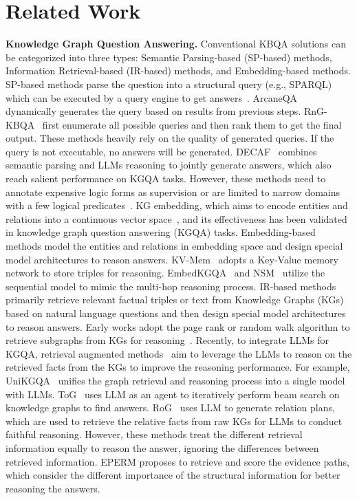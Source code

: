 \section{Related Work}
\textbf{Knowledge Graph Question Answering.}
Conventional KBQA solutions can be categorized into three types: Semantic Parsing-based (SP-based) methods, Information Retrieval-based (IR-based) methods, and Embedding-based methods. SP-based methods parse the question into a structural query (e.g., SPARQL) which can be executed by a query engine to get answers~\cite{lan2022complex}. ArcaneQA~\cite{gu2022arcaneqa} dynamically generates the query based on results from previous steps. RnG-KBQA~\cite{ye2021rng} first enumerate all possible queries and then rank them to get the final output. These methods heavily rely on the quality of generated queries. If the query is not executable, no answers will be generated. DECAF~\cite{donahue2014decaf} combines semantic parsing and LLMs reasoning to jointly generate answers, which also reach salient performance on KGQA tasks. However, these methods need to annotate expensive logic forms as supervision or are limited to narrow domains with a few logical predicates~\cite{lan2022complex}. KG embedding, which aims to encode entities and relations into a continuous vector space~\cite{bordes2013translating,long2022neural, sun2019rotate, long2024fact}, and its effectiveness has been validated in knowledge graph question answering (KGQA) tasks. Embedding-based methods model the entities and relations in embedding space and design special model architectures to reason answers. KV-Mem~\cite{miller2016key} adopts a Key-Value memory network to store triples for reasoning. EmbedKGQA~\cite{saxena2020improving} and NSM~\cite{he2021improving} utilize the sequential model to mimic the multi-hop reasoning process. IR-based methods primarily retrieve relevant factual triples or text from Knowledge Graphs (KGs) based on natural language questions and then design special model architectures to reason answers. Early works adopt the page rank or random walk algorithm to retrieve subgraphs from KGs for reasoning~\cite{sun2018open}. Recently, to integrate LLMs for KGQA, retrieval augmented methods~\cite{jiang2022unikgqa, luo2023reasoning} aim to leverage the LLMs to reason on the retrieved facts from the KGs to improve the reasoning performance. For example, UniKGQA~\cite{jiang2022unikgqa} unifies the graph retrieval and reasoning process into a single model with LLMs. ToG~\cite{sun2023think} uses LLM as an agent to iteratively perform beam search on knowledge graphs to find answers. RoG~\cite{luo2023reasoning} uses LLM to generate relation plans, which are used to retrieve the relative facts from raw KGs for LLMs to conduct faithful reasoning. However, these methods treat the different retrieval information equally to reason the answer, ignoring the differences between retrieved information. EPERM proposes to retrieve and score the evidence paths, which consider the different importance of the structural information for better reasoning the answers. 

